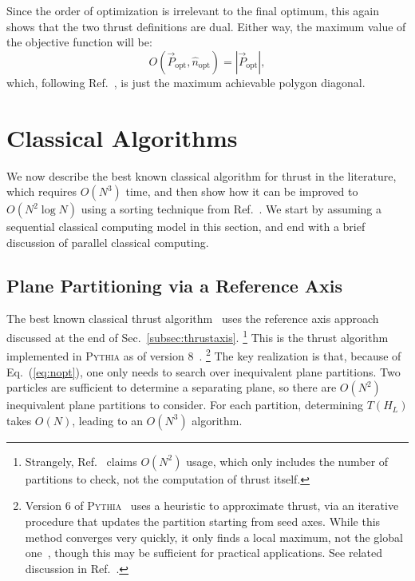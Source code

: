 \documentclass[aps,prd,twocolumn,superscriptaddress,preprintnumbers,nofootinbib,longbibliography,floatfix]{revtex4-1}
\DeclareRobustCommand{\Sec}[1]{Sec.~\ref{#1}}
\DeclareRobustCommand{\Eq}[1]{Eq.~(\ref{#1})}
\DeclareRobustCommand{\Ref}[1]{Ref.~\cite{#1}}
\newcommand{\opt}{\text{opt}}
\begin{document}
Since the order of optimization is irrelevant to the final optimum, this again shows that the two thrust definitions are dual.
%
Either way, the maximum value of the objective function will be:
%
\begin{equation}
O(\vec{P}_{\opt}, \hat{n}_{\opt})=|\vec{P}_{\opt}|,
\end{equation}
%
which, following \Ref{Brandt1979}, is just the maximum achievable polygon diagonal.




%
%


\section{Classical Algorithms}
\label{sec:classical}


We now describe the best known classical algorithm for thrust in the literature, which requires $O(N^3)$ time, and then show how it can be improved to $O(N^2\log N)$ using a sorting technique from \Ref{Salam:2007xv}.
%
We start by assuming a sequential classical computing model in this section, and end with a brief discussion of parallel classical computing.


\subsection{Plane Partitioning via a Reference Axis}
\label{sec:classical_paritioning}


The best known classical thrust algorithm~\cite{Yamamoto:1984fd} uses the reference axis approach discussed at the end of \Sec{subsec:thrustaxis}.%
\footnote{Strangely, \Ref{Yamamoto:1984fd} claims $O(N^2)$ usage, which only includes the number of partitions to check, not the computation of thrust itself.}
%
This is the thrust algorithm implemented in \textsc{Pythia} as of version 8~\cite{Sjostrand:2014zea}.%
%
\footnote{Version 6 of \textsc{Pythia}~\cite{Sjostrand:2006za} uses a heuristic to approximate thrust, via an iterative procedure that updates the partition starting from seed axes.  While this method converges very quickly, it only finds a local maximum, not the global one~\cite{Brandt1979}, though this may be sufficient for practical applications.  See related discussion in \Ref{Stewart:2015waa}.}
%
The key realization is that, because of \Eq{eq:nopt}, one only needs to search over inequivalent plane partitions.
%
Two particles are sufficient to determine a separating plane, so there are $O(N^2)$ inequivalent plane partitions to consider.
%
For each partition, determining $T(H_L)$ takes $O(N)$, leading to an $O(N^3)$ algorithm.
\end{document}
